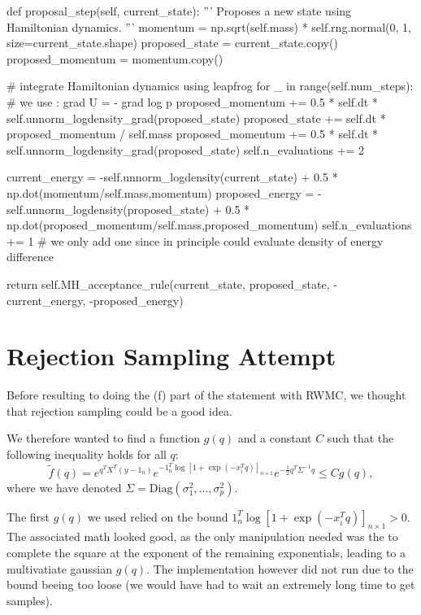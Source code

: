 \documentclass[a4paper, 12pt,oneside]{article}
\begin{document}
\begin{python}
				def proposal_step(self, current_state):
					'''
					Proposes a new state using Hamiltonian dynamics.
					'''
					momentum = np.sqrt(self.mass) * self.rng.normal(0, 1, size=current_state.shape)
					proposed_state = current_state.copy()
					proposed_momentum = momentum.copy()
					
					# integrate Hamiltonian dynamics using leapfrog
					for _ in range(self.num_steps):
						# we use : grad U = - grad log p
						proposed_momentum += 0.5 * self.dt * self.unnorm_logdensity_grad(proposed_state) 
						proposed_state += self.dt * proposed_momentum / self.mass
						proposed_momentum += 0.5 * self.dt * self.unnorm_logdensity_grad(proposed_state)
						self.n_evaluations += 2

					current_energy = -self.unnorm_logdensity(current_state) + 0.5 * np.dot(momentum/self.mass,momentum)
					proposed_energy = -self.unnorm_logdensity(proposed_state) + 0.5 * np.dot(proposed_momentum/self.mass,proposed_momentum)
					self.n_evaluations += 1
					# we only add one since in principle could evaluate density of energy difference
					
					return self.MH_acceptance_rule(current_state, proposed_state, -current_energy, -proposed_energy)
		\end{python}
		\section{Rejection Sampling Attempt}\label{appendix:rejection-sampling-attempt}
		Before resulting to doing the (f) part of the statement with RWMC, we thought that rejection sampling could be a good idea. 
		
		We therefore wanted to find a function $g(q)$ and a constant $C$ such that the following inequality holds for all $q$:
		\begin{equation}
			\tilde{f}(q) = e^{q^TX^T(y-1_{n})}e^{-1_{n}^T \log[1+\exp(-x_i^Tq)]_{n\times 1}}e^{-\frac{1}{2}q^T\Sigma^{-1} q} \leq Cg(q),
		\end{equation}
		where we have denoted $\Sigma=\text{Diag}(\sigma_1^2,...,\sigma_p^2)$.
		
		The first $g(q)$ we used relied on the bound $1_{n}^T \log[1+\exp(-x_i^Tq)]_{n\times 1}>0$. The associated math looked good, as the only manipulation needed was the to complete the square at the exponent of the remaining exponentials, leading to a multivatiate gaussian $g(q)$. The implementation however did not run due to the bound beeing too loose (we would have had to wait an extremely long time to get samples).
\end{document}
